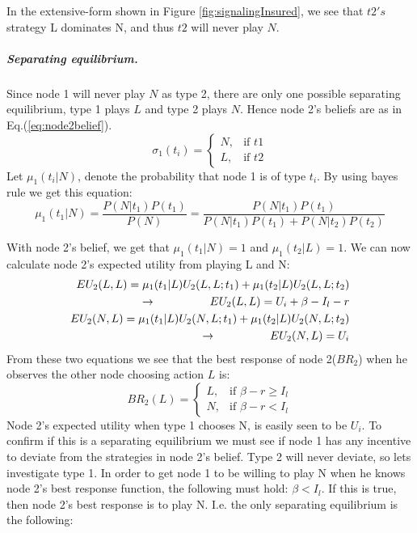 In the extensive-form shown in Figure \ref{fig:signalingInsured}, we see that $t2's$ strategy L dominates N, and thus $t2$ will never play $N$.
\subparagraph{Separating equilibrium.}
Since node 1 will never play $N$ as type 2, there are only one possible separating equilibrium, type 1 plays $L$ and type 2 plays $N$. Hence node 2's beliefs are as in Eq.(\ref{eq:node2belief}).
\begin{equation}
    \sigma_{1}(t_{i})= 
\begin{cases}
   N,& \text{if } t1\\
   L,& \text{if } t2  
\end{cases}
\label{eq:node2belief}
\end{equation}
Let $\mu_{1}(t_{i} | N )$, denote the probability that node 1 is of type $t_{i}$. By using bayes rule we get this equation:
\begin{equation}
\mu_{1}(t_{1} | N )=\frac{P(N|t_{1})P(t_{1})}{P(N)}=\frac{P(N|t_{1})P(t_{1})}{P(N|t_{1})P(t_{1})+P(N|t_{2})P(t_{2})}
\end{equation}

With node 2's belief, we get that $\mu_{1}(t_{1} | N )=1$ and $\mu_{1}(t_{2} | L )= 1 $. We can now calculate node 2's expected utility from playing L and N:
\begin{eqnarray}
EU_{2}(L,L)=\mu_{1}(t_{1} | L )U_{2}(L,L;t_{1})+\mu_{1}(t_{2} | L )U_{2}(L,L;t_{2}) \nonumber\\
\llap{$\rightarrow$\hspace{50pt}}EU_{2}(L,L)=U_{i}+\beta-I_{l}-r \\
EU_{2}(N,L)=\mu_{1}(t_{1} | L )U_{2}(N,L;t_{1})+\mu_{1}(t_{2} | L )U_{2}(N,L;t_{2})\nonumber\\
\llap{$\rightarrow$\hspace{50pt}}EU_{2}(N,L)=U_{i}
\end{eqnarray}
From these two equations we see that the best response of node 2($BR_2$) when he observes the other node choosing action $L$ is:
\begin{equation}
BR_{2}(L)=
\begin{cases}
L, & \text{if }\beta - r \geq I_{l}\\
N, & \text{if } \beta -r<I_{l}
\end{cases}
\label{eq:insuredBR}
\end{equation}
Node 2's expected utility when type 1 chooses N, is easily seen to be $U_{i}$. 
To confirm if this is a separating equilibrium we must see if node 1 has any incentive to deviate from the strategies in node 2's belief.
Type 2 will never deviate, so lets investigate type 1.
In order to get node 1 to be willing to play N when he knows node 2's best response function, the following must hold: $\beta<I_{l}$. If this is true, then node 2's best response is to play N. I.e. the only separating equilibrium is the following:

